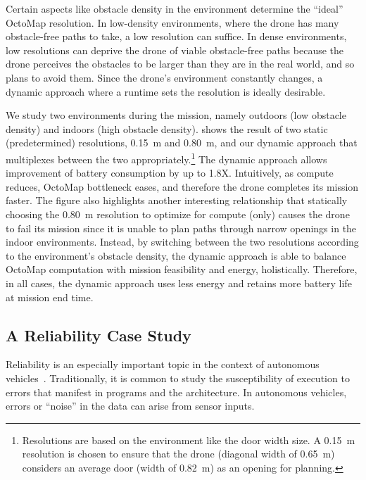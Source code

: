 {Certain aspects like obstacle density in the environment determine the ``ideal'' OctoMap resolution. In low-density environments, where the drone has many obstacle-free paths to take, a low resolution can suffice. In dense environments, low resolutions can deprive the drone of viable obstacle-free paths because the drone perceives the obstacles to be larger than they are in the real world, and so plans to avoid them. Since the drone's environment constantly changes, a dynamic approach where a runtime sets the resolution is ideally desirable.

We study two environments during the mission, namely outdoors (low obstacle density) and indoors (high obstacle density).  shows the result of two static (predetermined) resolutions, 0.15~m and 0.80~m, and our dynamic approach that multiplexes between the two appropriately.\footnote{Resolutions are based on the environment like the door width size. A 0.15~m resolution is chosen to ensure that the drone (diagonal width of 0.65~m) considers an average door (width of 0.82~m) as an opening for planning.} The dynamic approach allows improvement of battery consumption by up to 1.8X. 
Intuitively, as compute reduces, OctoMap bottleneck eases, and therefore the drone completes its mission faster. The figure also highlights another interesting relationship that statically choosing the 0.80~m resolution to optimize for compute (only) causes the drone to fail its mission since it is unable to plan paths through narrow openings in the indoor environments. Instead, by switching between the two resolutions according to the environment's obstacle density, the dynamic approach is able to balance OctoMap computation with mission feasibility and energy, holistically. Therefore, in all cases, the dynamic approach uses less energy and retains more battery life at mission end time.




\subsection{A Reliability Case Study}

Reliability is an especially important topic in the context of autonomous vehicles~\cite{reli-1, reli-2, reli-3, reli-4}. Traditionally, it is common to study the susceptibility of execution to errors that manifest in programs and the architecture. In autonomous vehicles, errors or ``noise'' in the data can arise from sensor inputs. 

}
